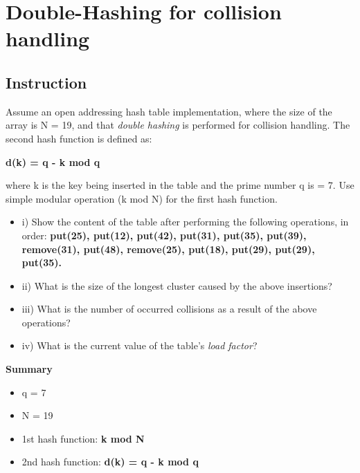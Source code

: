 \section{Double-Hashing for collision handling}
\subsection{Instruction}
Assume an open addressing hash table implementation, where the size of the array is N = 19,
and that \textit{double hashing} is performed for collision handling. The second hash function is defined
as:
\begin{center}
\textbf{d(k) = q - k mod q}
\end{center}
where k is the key being inserted in the table and the prime number q is = 7. Use simple modular
operation (k mod N) for the first hash function. 
\begin{itemize}
    \item i) Show the content of the table after performing the following operations, in order:
    \textbf{put(25), put(12), put(42), put(31), put(35), put(39), remove(31), put(48),
    remove(25), put(18), put(29), put(29), put(35).}
    \item ii) What is the size of the longest cluster caused by the above insertions?
    \item iii) What is the number of occurred collisions as a result of the above operations?
    \item iv) What is the current value of the table’s \textit{load factor}?
    \\
\end{itemize}

\textbf{Summary}
\begin{itemize} 
    \item q = 7
    \item N = 19
    \item 1st hash function: \textbf{k mod N}
    \item 2nd hash function: \textbf{d(k) = q - k mod q}
\end{itemize}


